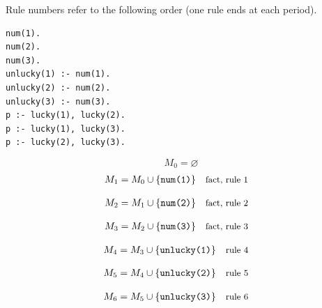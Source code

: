 \documentclass[a4paper,11pt]{article}
\newif\ifexplain
\newcommand{\explain}[1]{\ifexplain\begin{erklbox}#1\end{erklbox}\fi}
\newcommand{\why}[1]{\text{\small #1}}
\newcommand{\at}[1]{\texttt{#1}}
\begin{document}
Rule numbers refer to the following order (one rule ends at each period).
\begin{small}
\begin{verbatim}
num(1).
num(2).
num(3).
unlucky(1) :- num(1).
unlucky(2) :- num(2).
unlucky(3) :- num(3).
p :- lucky(1), lucky(2).
p :- lucky(1), lucky(3).
p :- lucky(2), lucky(3).
\end{verbatim}
\end{small}
\explain{Beim Redukt bleibt die Kandidatenmenge fest. Wir entscheiden zuerst, welche Regeln wegfallen. Erst danach berechnen wir aus den verbleibenden positiven Regeln die kleinste abgeschlossene Menge. Ein Modell allein reicht nicht: Diese Menge muss genau der Kandidat sein.}
\[
M_0=\varnothing
\]
\begin{align*}
M_{1} &= M_{0}\cup \{\at{num(1)}\} && \why{fact, rule 1}
\end{align*}
\explain{Diese Regel hat keinen Körper. Ihr Kopf $\at{num(1)}$ ist damit ein Fakt und muss in die Menge.}
\begin{align*}
M_{2} &= M_{1}\cup \{\at{num(2)}\} && \why{fact, rule 2}
\end{align*}
\explain{Diese Regel hat keinen Körper. Ihr Kopf $\at{num(2)}$ ist damit ein Fakt und muss in die Menge.}
\begin{align*}
M_{3} &= M_{2}\cup \{\at{num(3)}\} && \why{fact, rule 3}
\end{align*}
\explain{Diese Regel hat keinen Körper. Ihr Kopf $\at{num(3)}$ ist damit ein Fakt und muss in die Menge.}
\begin{align*}
M_{4} &= M_{3}\cup \{\at{unlucky(1)}\} && \why{rule 4}
\end{align*}
\explain{Für $\at{unlucky(1)}$ brauchen wir $\at{num(1)}$. Weil diese Voraussetzungen bereits hergeleitet sind, dürfen wir den Regelkopf jetzt aufnehmen und alle bisherigen Atome behalten; bei einer fehlenden Voraussetzung würde diese Regel dagegen noch nichts beitragen.}
\begin{align*}
M_{5} &= M_{4}\cup \{\at{unlucky(2)}\} && \why{rule 5}
\end{align*}
\explain{Für $\at{unlucky(2)}$ brauchen wir $\at{num(2)}$. Weil diese Voraussetzungen bereits hergeleitet sind, dürfen wir den Regelkopf jetzt aufnehmen und alle bisherigen Atome behalten; bei einer fehlenden Voraussetzung würde diese Regel dagegen noch nichts beitragen.}
\begin{align*}
M_{6} &= M_{5}\cup \{\at{unlucky(3)}\} && \why{rule 6}
\end{align*}
\end{document}
